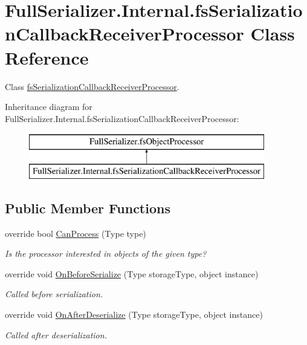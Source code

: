 \hypertarget{class_full_serializer_1_1_internal_1_1fs_serialization_callback_receiver_processor}{}\section{Full\+Serializer.\+Internal.\+fs\+Serialization\+Callback\+Receiver\+Processor Class Reference}
\label{class_full_serializer_1_1_internal_1_1fs_serialization_callback_receiver_processor}


Class \hyperlink{class_full_serializer_1_1_internal_1_1fs_serialization_callback_receiver_processor}{fs\+Serialization\+Callback\+Receiver\+Processor}.  


Inheritance diagram for Full\+Serializer.\+Internal.\+fs\+Serialization\+Callback\+Receiver\+Processor\+:\begin{figure}[H]
\begin{center}
\leavevmode
\includegraphics[height=2.000000cm]{class_full_serializer_1_1_internal_1_1fs_serialization_callback_receiver_processor}
\end{center}
\end{figure}
\subsection*{Public Member Functions}
\begin{DoxyCompactItemize}
\item 
override bool \hyperlink{class_full_serializer_1_1_internal_1_1fs_serialization_callback_receiver_processor_ae3e6db6e345aea48bb0cb8e63e8f4d6f}{Can\+Process} (Type type)
\begin{DoxyCompactList}\small\item\em Is the processor interested in objects of the given type? \end{DoxyCompactList}\item 
override void \hyperlink{class_full_serializer_1_1_internal_1_1fs_serialization_callback_receiver_processor_a8013e3b964d24ee85c19fcd33997c104}{On\+Before\+Serialize} (Type storage\+Type, object instance)
\begin{DoxyCompactList}\small\item\em Called before serialization. \end{DoxyCompactList}\item 
override void \hyperlink{class_full_serializer_1_1_internal_1_1fs_serialization_callback_receiver_processor_a29733358c2bfa204e3a043fbc28d644d}{On\+After\+Deserialize} (Type storage\+Type, object instance)
\begin{DoxyCompactList}\small\item\em Called after deserialization. \end{DoxyCompactList}\end{DoxyCompactItemize}


